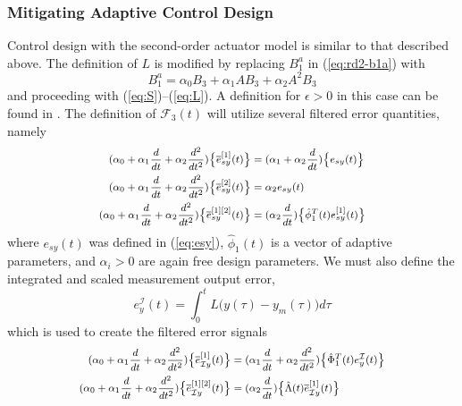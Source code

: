 \documentclass[english]{ifacconf}
\begin{document}
\subsubsection{Mitigating Adaptive Control Design}
Control design with the second-order actuator model is similar to that described above. The definition of $L$ is modified by replacing $B_1^a$ in (\ref{eq:rd2-b1a}) with
\begin{equation}
B_1^a = \alpha_0 B_3 + \alpha_1 A B_3 + \alpha_2 A^2 B_3 \label{eq:rd3-b1a}
\end{equation}
and proceeding with (\ref{eq:S})--(\ref{eq:L}). A definition for $\epsilon>0$ in this case can be found in \cite{qu2016phd}. The definition of $\mathcal{F}_3(t)$ will utilize several filtered error quantities, namely
\begin{equation} \small
\begin{aligned} 
	(\alpha_0 + \alpha_1 \frac{d}{dt} + \alpha_2 \frac{d^2}{dt^2} )\big \{ \overline{e}_{sy}^{[1]}(t) \big \} & = (\alpha_1 + \alpha_2 \frac{d}{dt}) \big \{ e_{sy}(t) \big \} \\
	(\alpha_0 + \alpha_1 \frac{d}{dt} + \alpha_2 \frac{d^2}{dt^2} )\big \{ \overline{e}_{sy}^{[2]}(t) \big \} & = \alpha_2 e_{sy}(t) \\
	(\alpha_0 + \alpha_1 \frac{d}{dt} + \alpha_2 \frac{d^2}{dt^2} )\big \{ \overline{e}_{sy}^{[1][2]}(t) \big \} & = (\alpha_2 \frac{d}{dt}) \big \{ \hat{\phi}_1^T(t) \bar{e}_{sy}^{[1]}(t) \big \}
\end{aligned}	
\end{equation}
where $e_{sy}(t)$ was defined in (\ref{eq:esy}), $\hat{\phi}_1(t)$ is a vector of adaptive parameters, and $\alpha_i > 0$ are again free design parameters. We must also define the integrated and scaled measurement output error, 
\begin{equation}
e_{y}^{\mathcal{I}}(t) = \int_0^{t} L\big (y(\tau) - y_m(\tau)\big) d\tau
\end{equation}
which is used to create the filtered error signals
\begin{equation} \small
\begin{aligned}
	(\alpha_0 + \alpha_1 \frac{d}{dt} + \alpha_2 \frac{d^2}{dt^2} )\big \{  \overline{e}_{\mathcal{I}y}^{[1]} (t) \big \} &= (\alpha_1 \frac{d}{dt} + \alpha_2 \frac{d^2}{dt^2}) \big \{ \hat{\Phi}_1^T (t) e_{y}^{\mathcal{I}}(t) \big \} \\
	(\alpha_0 + \alpha_1 \frac{d}{dt} + \alpha_2 \frac{d^2}{dt^2} )\big \{  \overline{e}_{\mathcal{I}y}^{[1][2]} (t) \big \} &= (\alpha_2 \frac{d}{dt}) \big \{ \hat{\Lambda}(t) \overline{e}_{\mathcal{I}y}^{[1]} (t) \big \}
\end{aligned}	
\end{equation}
\end{document}
